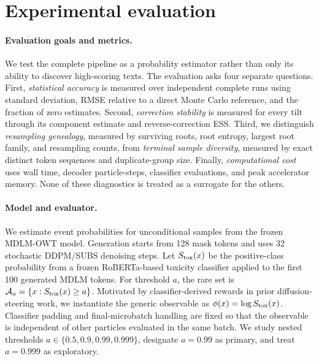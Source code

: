 \documentclass{article}
\begin{document}
\section{Experimental evaluation}
\label{sec:experiments}

\paragraph{Evaluation goals and metrics.}
We test the complete pipeline as a probability estimator rather than only its
ability to discover high-scoring texts. The evaluation asks four separate
questions. First, \emph{statistical accuracy} is measured over independent
complete runs using standard deviation, RMSE relative to a direct Monte Carlo
reference, and the fraction of zero estimates. Second, \emph{correction
stability} is measured for every tilt through its component estimate and
reverse-correction ESS. Third, we distinguish \emph{resampling genealogy},
measured by surviving roots, root entropy, largest root family, and resampling
counts, from \emph{terminal sample diversity}, measured by exact distinct token
sequences and duplicate-group size. Finally, \emph{computational cost} uses
wall time, decoder particle-steps, classifier evaluations, and peak accelerator
memory. None of these diagnostics is treated as a surrogate for the others.

\paragraph{Model and evaluator.}
We estimate event probabilities for unconditional samples from the frozen
MDLM-OWT model. Generation
starts from 128 mask tokens and uses 32 stochastic DDPM/SUBS denoising steps.
Let $S_{\rm tox}(x)$ be the positive-class probability from a frozen
RoBERTa-based toxicity classifier applied to the first 100 generated MDLM
tokens. For threshold $a$, the rare set is
$\mathcal A_a=\{x:S_{\rm tox}(x)\geq a\}$. Motivated by classifier-derived
rewards in prior diffusion-steering work, we instantiate the generic
observable as $\phi(x)=\log S_{\rm tox}(x)$. Classifier padding and
final-microbatch handling are fixed so that the observable is independent of
other particles evaluated in the same batch. We study nested thresholds
\(
a\in\{0.5,0.9,0.99,0.999\}
\), designate $a=0.99$ as primary, and treat $a=0.999$ as exploratory.
\end{document}
